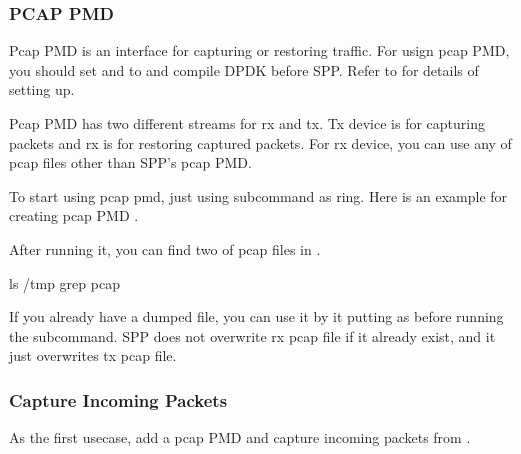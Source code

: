 \documentclass[a4paper,11pt,openany,oneside,english]{sphinxmanual}
\begin{document}
\subsubsection{PCAP PMD}
\label{\detokenize{usecases/spp_nfv:pcap-pmd}}
Pcap PMD is an interface for capturing or restoring traffic.
For usign pcap PMD, you should set 
and  to  and compile DPDK before SPP.
Refer to
{\hyperref[\detokenize{gsg/install:setup-install-dpdk-spp}]{}}
for details of setting up.

Pcap PMD has two different streams for rx and tx.
Tx device is for capturing packets and rx is for restoring captured
packets.
For rx device, you can use any of pcap files other than SPP’s pcap PMD.

To start using pcap pmd, just using  subcommand as ring.
Here is an example for creating pcap PMD .

\begin{sphinxVerbatim}[commandchars=\\\{\},formatcom=\footnotesize]
\end{sphinxVerbatim}

After running it, you can find two of pcap files in .

\begin{sphinxVerbatim}[commandchars=\\\{\},formatcom=\footnotesize]
 ls /tmp  grep pcap\PYGZdl{}
\end{sphinxVerbatim}

If you already have a dumped file, you can use it by it putting as
 before running the  subcommand.
SPP does not overwrite rx pcap file if it already exist,
and it just overwrites tx pcap file.


\subsubsection{Capture Incoming Packets}
\label{\detokenize{usecases/spp_nfv:capture-incoming-packets}}
As the first usecase, add a pcap PMD and capture incoming packets from
.
\end{document}
